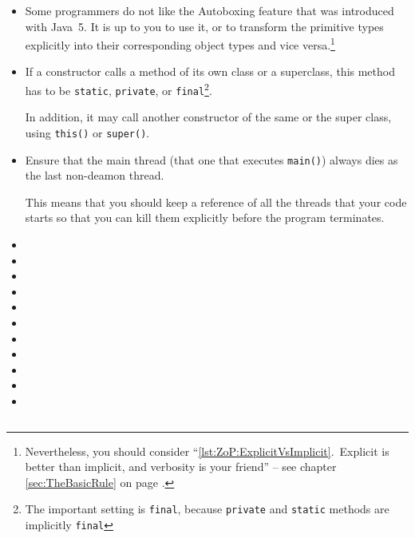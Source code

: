 \documentclass[11pt,a4paper, titlepage, parskip=half, headsepline, footsepline, cleardoublepage=current, headheight=1cm]{scrbook}
\newcommand*{\tqvref}[1]{\hyperref[{#1}]{\ref*{#1}} on page \pageref{#1}}
\begin{document}
\begin{itemize}
\item{Some programmers do not like the Autoboxing feature that was introduced with Java~5. It is up to you to use it, or to transform the primitive types explicitly into their corresponding object types and vice versa.\footnote{Nevertheless, you should consider “\ref{lst:ZoP:ExplicitVsImplicit}.~Explicit is better than implicit, and verbosity is your friend” – see chapter \tqvref{sec:TheBasicRule}.}}

\item{If a constructor calls a method of its own class or a superclass, this method has to be \lstinline|static|, \lstinline|private|, or \lstinline|final|\footnote{The important setting is \lstinline|final|, because \lstinline|private| and \lstinline|static| methods are implicitly \lstinline|final|}.

In addition, it may call another constructor of the same or the super class, using \lstinline|this()| or \lstinline|super()|.}

\item{Ensure that the main thread (that one that executes \lstinline|main()|) always dies as the last non-deamon thread.

This means that you should keep a reference of all the threads that your code starts so that you can kill them explicitly before the program terminates.}

\item{}

\item{}

\item{}

\item{}

\item{}

\item{}

\item{}

\item{}

\item{}

\item{}

\item{}
\end{itemize}

\begin{lstlisting}
\end{lstlisting}
\end{document}
